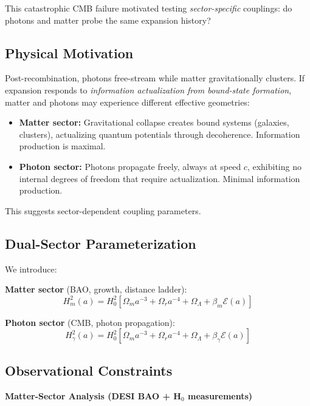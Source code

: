 \documentclass[twocolumn,superscriptaddress,prl,amsmath,amssymb]{revtex4-2}
\begin{document}
This catastrophic CMB failure motivated testing \textit{sector-specific} couplings: do photons and matter probe the same expansion history?

\subsection{Physical Motivation}

Post-recombination, photons free-stream while matter gravitationally clusters. If expansion responds to \textit{information actualization from bound-state formation}, matter and photons may experience different effective geometries:

\begin{itemize}
\item \textbf{Matter sector:} Gravitational collapse creates bound systems (galaxies, clusters), actualizing quantum potentials through decoherence. Information production is maximal.
\item \textbf{Photon sector:} Photons propagate freely, always at speed $c$, exhibiting no internal degrees of freedom that require actualization. Minimal information production.
\end{itemize}

This suggests sector-dependent coupling parameters.

\subsection{Dual-Sector Parameterization}

We introduce:

\textbf{Matter sector} (BAO, growth, distance ladder):
\begin{equation}
H^2_m(a) = H_0^2[\Omega_m a^{-3} + \Omega_r a^{-4} + \Omega_\Lambda + \beta_m \mathcal{E}(a)]
\end{equation}

\textbf{Photon sector} (CMB, photon propagation):
\begin{equation}
H^2_\gamma(a) = H_0^2[\Omega_m a^{-3} + \Omega_r a^{-4} + \Omega_\Lambda + \beta_\gamma \mathcal{E}(a)]
\end{equation}

\subsection{Observational Constraints}

\textbf{Matter-Sector Analysis (DESI BAO + H$_0$ measurements)}
\end{document}

